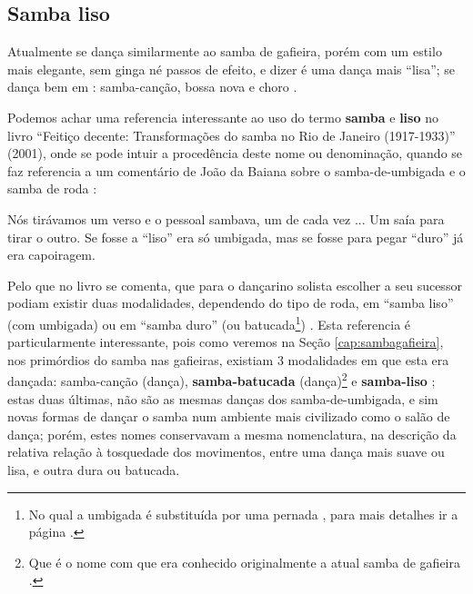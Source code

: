 \subsection{Samba liso} 
\label{subsec:sambalisodef}
Atualmente se dança similarmente ao samba de gafieira, 
porém com um estilo mais elegante, sem ginga né passos de efeito, e dizer é uma dança mais ``lisa'';
se dança bem em : samba-canção, bossa nova e choro \cite[pp. 134]{perna2002samba}.~\\


Podemos achar uma referencia interessante ao uso do termo \textbf{samba} e \textbf{liso}  no livro 
``Feitiço decente: Transformações do samba no Rio de Janeiro (1917-1933)'' (2001),
onde se pode intuir a procedência deste nome ou denominação, 
quando se faz referencia a um comentário de João da Baiana sobre o samba-de-umbigada e o samba de roda \cite[pp. 109]{sandroni2001feitico}: 
\begin{citando}
Nós tirávamos um verso e o pessoal sambava, um de cada vez ... 
Um saía para tirar o outro.
Se fosse a ``liso'' era só umbigada, mas se fosse para pegar ``duro'' já era capoiragem. 
\end{citando}
Pelo que no livro se comenta, que para o dançarino solista  escolher a seu sucessor podiam
existir duas modalidades, dependendo do tipo de roda, em ``samba liso'' (com umbigada) ou em ``samba duro'' 
(ou batucada\footnote{No qual a umbigada é substituída por uma pernada \cite[pp. 109]{sandroni2001feitico},
para mais detalhes ir a página \pageref{ref:batuquedanca}.}) \cite[pp. 109]{sandroni2001feitico}.
Esta referencia 
é particularmente interessante, pois como veremos na Seção \ref{cap:sambagafieira},
nos primórdios do samba nas gafieiras, existiam 3 modalidades em que esta era dançada: samba-canção (dança),
\textbf{samba-batucada} (dança)\footnote{Que 
é o nome com que era conhecido originalmente a atual samba de gafieira \cite[pp. 143]{perna2002samba}.} 
e \textbf{samba-liso} \cite[pp. 143]{perna2002samba};
estas duas últimas, não são as mesmas danças dos samba-de-umbigada, 
e sim novas formas de dançar o samba num ambiente mais civilizado como o salão de dança;
porém, estes nomes conservavam a mesma nomenclatura, na descrição 
da relativa relação à tosquedade dos movimentos, entre uma dança mais suave ou lisa, 
e outra dura ou batucada.~\\

